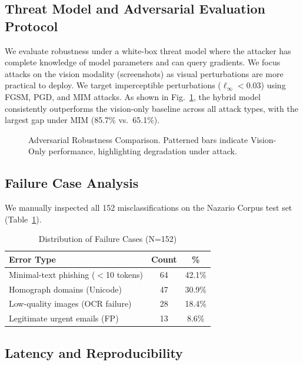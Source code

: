 \documentclass[conference]{IEEEtran}
\begin{document}
\subsection{Threat Model and Adversarial Evaluation Protocol}

We evaluate robustness under a white-box threat model where the attacker has complete knowledge of model parameters and can query gradients. We focus attacks on the vision modality (screenshots) as visual perturbations are more practical to deploy. We target imperceptible perturbations ($\ell_\infty < 0.03$) using FGSM, PGD, and MIM attacks. As shown in Fig.~\ref{fig:adversarial}, the hybrid model consistently outperforms the vision-only baseline across all attack types, with the largest gap under MIM (85.7\% vs.\ 65.1\%).

\begin{figure}[t]
    \centering
    \caption{Adversarial Robustness Comparison. Patterned bars indicate Vision-Only performance, highlighting degradation under attack.}
    \label{fig:adversarial}
\end{figure}

\subsection{Failure Case Analysis}

We manually inspected all 152 misclassifications on the Nazario Corpus test set (Table~\ref{tab:failures}).

\begin{table}[t]
    \centering
    \caption{Distribution of Failure Cases (N=152)}
    \label{tab:failures}
    \begin{tabular}{lcc}
        \toprule
        Error Type & Count & \% \\
        \midrule
        Minimal-text phishing ($<$10 tokens) & 64 & 42.1\% \\
        Homograph domains (Unicode) & 47 & 30.9\% \\
        Low-quality images (OCR failure) & 28 & 18.4\% \\
        Legitimate urgent emails (FP) & 13 & 8.6\% \\
        \bottomrule
    \end{tabular}
\end{table}

\subsection{Latency and Reproducibility}
\end{document}
